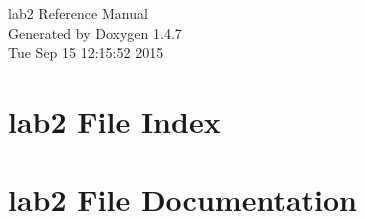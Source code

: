 \documentclass[a4paper]{book}
\begin{document}
\begin{titlepage}
\vspace*{7cm}
\begin{center}
{\Large lab2 Reference Manual}\\
\vspace*{1cm}
{\large Generated by Doxygen 1.4.7}\\
\vspace*{0.5cm}
{\small Tue Sep 15 12:15:52 2015}\\
\end{center}
\end{titlepage}
\clearemptydoublepage
{}
\tableofcontents
\clearemptydoublepage
{}
\chapter{lab2 File Index}

\chapter{lab2 File Documentation}








\printindex
\end{document}
